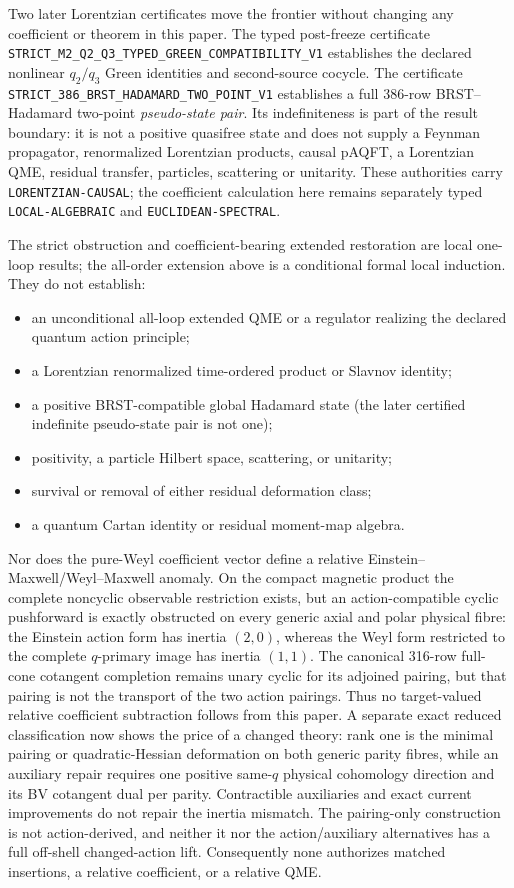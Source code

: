 \documentclass[11pt]{article}
\theoremstyle{definition}
\theoremstyle{remark}
\newcommand{\cert}[1]{\nolinkurl{#1}}
\begin{document}
Two later Lorentzian certificates move the frontier without changing any
coefficient or theorem in this paper.  The typed post-freeze certificate
\cert{STRICT_M2_Q2_Q3_TYPED_GREEN_COMPATIBILITY_V1} establishes the declared
nonlinear \(q_2/q_3\) Green identities and second-source cocycle.  The
certificate \cert{STRICT_386_BRST_HADAMARD_TWO_POINT_V1} establishes a full
386-row BRST--Hadamard two-point \emph{pseudo-state pair}.  Its indefiniteness
is part of the result boundary: it is not a positive quasifree state and does
not supply a Feynman propagator, renormalized Lorentzian products, causal
pAQFT, a Lorentzian QME, residual transfer, particles, scattering or
unitarity.  These authorities carry \cert{LORENTZIAN-CAUSAL}; the coefficient
calculation here remains separately typed \cert{LOCAL-ALGEBRAIC} and
\cert{EUCLIDEAN-SPECTRAL}.

The strict obstruction and coefficient-bearing extended restoration are
local one-loop results; the all-order extension above is a conditional formal
local induction.  They do not establish:
\begin{itemize}
\item an unconditional all-loop extended QME or a regulator realizing the
declared quantum action principle;
\item a Lorentzian renormalized time-ordered product or Slavnov identity;
\item a positive BRST-compatible global Hadamard state (the later certified
indefinite pseudo-state pair is not one);
\item positivity, a particle Hilbert space, scattering, or unitarity;
\item survival or removal of either residual deformation class;
\item a quantum Cartan identity or residual moment-map algebra.
\end{itemize}

Nor does the pure-Weyl coefficient vector define a relative
Einstein--Maxwell/Weyl--Maxwell anomaly.  On the compact magnetic product the
complete noncyclic observable restriction exists, but an action-compatible
cyclic pushforward is exactly obstructed on every generic axial and polar
physical fibre: the Einstein action form has inertia $(2,0)$, whereas the
Weyl form restricted to the complete $q$-primary image has inertia $(1,1)$.
The canonical 316-row full-cone cotangent completion remains unary cyclic for
its adjoined pairing, but that pairing is not the transport of the two action
pairings.  Thus no target-valued relative coefficient subtraction follows
from this paper.  A separate exact reduced classification now shows the price
of a changed theory: rank one is the minimal pairing or quadratic-Hessian
deformation on both generic parity fibres, while an auxiliary repair requires
one positive same-$q$ physical cohomology direction and its BV cotangent dual
per parity.  Contractible auxiliaries and exact current improvements do not
repair the inertia mismatch.  The pairing-only construction is not
action-derived, and neither it nor the action/auxiliary alternatives has a
full off-shell changed-action lift.  Consequently none authorizes matched
insertions, a relative coefficient, or a relative QME.
\end{document}
